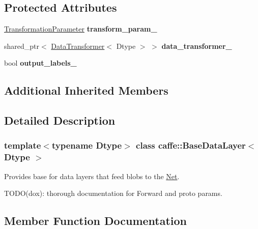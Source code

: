 \subsection*{Protected Attributes}
\begin{DoxyCompactItemize}
\item 
\mbox{\label{classcaffe_1_1_base_data_layer_a325727e5c4f305a3ffa5c8efc211a1c9}} 
\mbox{\hyperlink{classcaffe_1_1_transformation_parameter}{Transformation\+Parameter}} {\bfseries transform\+\_\+param\+\_\+}
\item 
\mbox{\label{classcaffe_1_1_base_data_layer_ab2a13e43b3de81cc97df8496cfc632b1}} 
shared\+\_\+ptr$<$ \mbox{\hyperlink{classcaffe_1_1_data_transformer}{Data\+Transformer}}$<$ Dtype $>$ $>$ {\bfseries data\+\_\+transformer\+\_\+}
\item 
\mbox{\label{classcaffe_1_1_base_data_layer_a802076913164842d1f698014b489ca2e}} 
bool {\bfseries output\+\_\+labels\+\_\+}
\end{DoxyCompactItemize}
\subsection*{Additional Inherited Members}


\subsection{Detailed Description}
\subsubsection*{template$<$typename Dtype$>$\newline
class caffe\+::\+Base\+Data\+Layer$<$ Dtype $>$}

Provides base for data layers that feed blobs to the \mbox{\hyperlink{classcaffe_1_1_net}{Net}}. 

T\+O\+D\+O(dox)\+: thorough documentation for Forward and proto params. 

\subsection{Member Function Documentation}
\mbox{\label{classcaffe_1_1_base_data_layer_a7028919adf87326b808a2c7b21e8e927}} 
